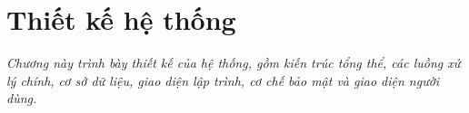 \chapter{Thiết kế hệ thống}
\label{chapter:thietke}

\textit{Chương này trình bày thiết kế của hệ thống, gồm kiến trúc tổng thể, các luồng xử lý chính, cơ sở dữ liệu, giao diện lập trình, cơ chế bảo mật và giao diện người dùng.}







